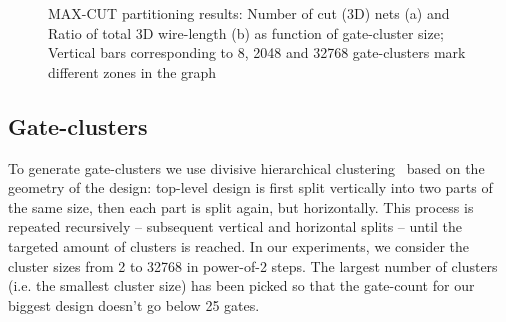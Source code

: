 \documentclass[conference]{IEEEtran}
\begin{document}
\begin{figure}
\centering
{}
{}
\caption{MAX-CUT partitioning results: Number of cut (3D) nets (a) and Ratio of total 3D wire-length (b) as function of gate-cluster size; Vertical bars corresponding to 8, 2048 and 32768 gate-clusters mark different zones in the graph}
\label{fig:3Dnets}
\end{figure} 

\subsection{Gate-clusters}\label{sec:gate-cluster}
To generate gate-clusters we use divisive hierarchical clustering~\cite{Rokach2005} based on the geometry of the design: top-level design is first split vertically into two parts of the same size, then each part is split again, but horizontally. This process is repeated recursively -- subsequent vertical and horizontal splits -- until the targeted amount of clusters is reached. In our experiments, we consider the cluster sizes from 2 to 32768 in power-of-2 steps. The largest number of clusters (i.e. the smallest cluster size) has been picked so that the gate-count for our biggest design doesn't go below 25 gates.
\end{document}
